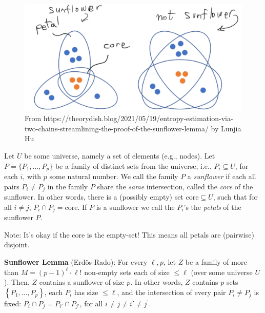 \begin{figure}
    \centering
        \includegraphics[width=0.75\linewidth]{images/sunflower-lemma.png}
    \caption{From https://theorydish.blog/2021/05/19/entropy-estimation-via-two-chains-streamlining-the-proof-of-the-sunflower-lemma/ by Lunjia Hu}
    \label{fig:enter-label}
\end{figure}




\begin{svgraybox}
\begin{definition}[Sunflower] Let $U$ be some universe, namely a set of elements (e.g., nodes). Let $P=\{P_1,\dots,P_p\}$ be a family of distinct sets from the universe, i.e., $P_i\subseteq U$, for each $i$, with $p$ some natural number. 
We call the family $P$ a \emph{sunflower} if each all pairs $P_i \neq P_j$ in the family $P$ share the \emph{same} intersection, called the \emph{core} of the sunflower.
In other words, there is a (possibly empty) set $\mathrm{core}\subseteq U$, such that for all $i\neq j$,  $ P_i\cap P_j = \mathrm{core}$.
If $P$ is a sunflower we call the $P_i$'s the \emph{petals} of the sunflower $P$.
\end{definition}
\end{svgraybox}
Note: It's okay if the core is the empty-set! This means all petals are (pairwise) disjoint.


\begin{svgraybox}
\textbf{Sunflower Lemma} (Erd\"os-Rado): For every $\ell, p$, let $Z$ be a family of more than $M=(p-1)^\ell \cdot \ell!$ non-empty sets each of size $\leqslant \ell$ (over some universe $U$). Then, $Z$ contains a sunflower of size $p$. In other words, $Z$ contains $p$ sets $\left\{P_1, \ldots, P_p\right\}$, each $P_i$ has size $\leqslant \ell$, and the intersection of every pair $P_i \neq P_j$ is fixed: $P_i \cap P_j=P_{i'} \cap P_{j'}$, for all $i \neq j \neq i' \neq j^{\prime}$.
\end{svgraybox}



